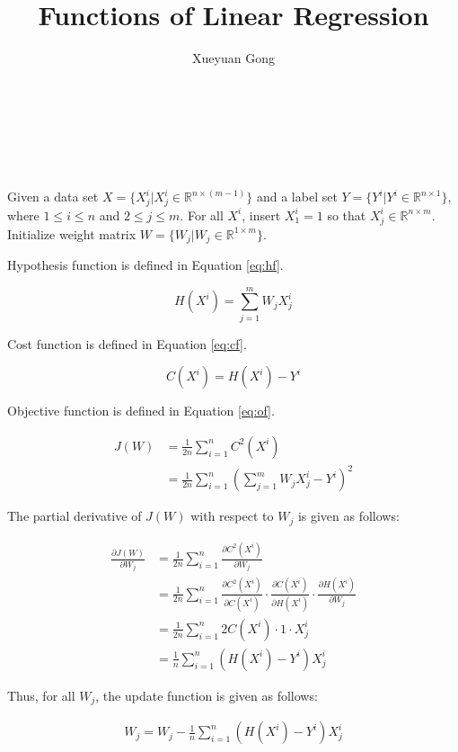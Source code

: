 \documentclass{sig-alternate}
\begin{document}
\title{Functions of Linear Regression}

\author{
	\alignauthor
	Xueyuan Gong\\
	\\
	\\
    \\
    \\
}

\maketitle

Given a data set $X=\{X^{i}_{j}|X^{i}_{j}\in \mathbb{R}^{n\times (m-1)}\}$ and a label set $Y=\{Y^{i}|Y^{i}\in \mathbb{R}^{n\times 1}\}$, where $1\leq i\leq n$ and $2\leq j \leq m$. For all $X^{i}$, insert $X^{i}_{1}=1$ so that $X^{i}_{j}\in \mathbb{R}^{n\times m}$. Initialize weight matrix $W=\{W_{j}|W_{j}\in \mathbb{R}^{1\times m}\}$.

Hypothesis function is defined in Equation \eqref{eq:hf}.

\begin{equation}
\label{eq:hf}
	H(X^{i})=\sum_{j=1}^{m}W_{j}X^{i}_{j}
\end{equation}

Cost function is defined in Equation \eqref{eq:cf}.

\begin{equation}
\label{eq:cf}
	C(X^{i})=H(X^{i})-Y^{i}
\end{equation}

Objective function is defined in Equation \eqref{eq:of}.

\begin{equation}
\label{eq:of}
	\begin{aligned}
	J(W)&=\frac{1}{2n}\sum_{i=1}^{n}C^2(X^{i})\\
		&=\frac{1}{2n}\sum_{i=1}^{n}(\sum_{j=1}^{m}W_{j}X^{i}_{j}-Y^{i})^{2}
	\end{aligned}
\end{equation}

The partial derivative of $J(W)$ with respect to $W_{j}$ is given as follows:

\begin{align*}
	\frac{\partial{J(W)}}{\partial{W_{j}}}
	&=\frac{1}{2n}\sum_{i=1}^{n}\frac{\partial{C^2(X^{i})}}{\partial{W_{j}}}\\
	&=\frac{1}{2n}\sum_{i=1}^{n}\frac{\partial{C^2(X^{i})}}{\partial{C(X^{i})}}\cdot \frac{\partial{C(X^{i})}}{\partial{H(X^{i})}}\cdot \frac{\partial{H(X^{i})}}{\partial{W_{j}}}\\
	&=\frac{1}{2n}\sum_{i=1}^{n}2C(X^{i})\cdot 1\cdot X^{i}_{j}\\
	&=\frac{1}{n}\sum_{i=1}^{n}(H(X^{i})-Y^{i})X^{i}_{j}
\end{align*}

Thus, for all $W_{j}$, the update function is given as follows:

\begin{align*}
	W_{j}=W_{j}-\frac{1}{n}\sum_{i=1}^{n}(H(X^{i})-Y^{i})X^{i}_{j}
\end{align*}
\end{document}
